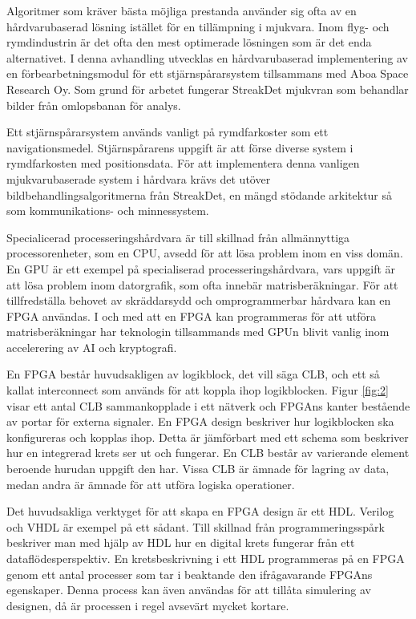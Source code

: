 \documentclass[12pt]{report}
\begin{document}
Algoritmer som kräver bästa möjliga prestanda använder sig ofta av en hårdvarubaserad lösning istället för en tillämpning i mjukvara. Inom flyg- och rymdindustrin är det ofta den mest optimerade lösningen som är det enda alternativet. I denna avhandling utvecklas en hårdvarubaserad implementering av en förbearbetningsmodul för ett stjärnspårarsystem tillsammans med Aboa Space Research Oy. Som grund för arbetet fungerar StreakDet mjukvran som behandlar bilder från omlopsbanan för analys. 
\par
Ett stjärnspårarsystem används vanligt på rymdfarkoster som ett navigationsmedel. Stjärnspårarens uppgift är att förse diverse system i rymdfarkosten med positionsdata. För att implementera denna vanligen mjukvarubaserade system i hårdvara krävs det utöver bildbehandlingsalgoritmerna från StreakDet, en mängd stödande arkitektur så som kommunikations- och minnessystem.
\par
Specialicerad processeringshårdvara är till skillnad från allmännyttiga processorenheter, som en CPU, avsedd för att lösa problem inom en viss domän. En GPU är ett exempel på specialiserad processeringshårdvara, vars uppgift är att lösa problem inom datorgrafik, som ofta innebär matrisberäkningar. För att tillfredställa behovet av skräddarsydd och omprogrammerbar hårdvara kan en FPGA användas. I och med att en FPGA kan programmeras för att utföra matrisberäkningar har teknologin tillsammands med GPUn blivit vanlig inom accelerering av AI och kryptografi.
\par
En FPGA består huvudsakligen av logikblock, det vill säga CLB, och ett så kallat interconnect som används för att koppla ihop logikblocken. Figur \ref{fig:2} visar ett antal CLB sammankopplade i ett nätverk och FPGAns kanter bestående av portar för externa signaler. En FPGA design beskriver hur logikblocken ska konfigureras och kopplas ihop. Detta är jämförbart med ett schema som beskriver hur en integrerad krets ser ut och fungerar. En CLB består av varierande element beroende hurudan uppgift den har. Vissa CLB är ämnade för lagring av data, medan andra är ämnade för att utföra logiska operationer. \citep{XilVivado}
\par
Det huvudsakliga verktyget för att skapa en FPGA design är ett HDL. Verilog och VHDL är exempel på ett sådant. Till skillnad från programmeringsspårk beskriver man med hjälp av HDL hur en digital krets fungerar från ett dataflödesperspektiv. En kretsbeskrivning i ett HDL programmeras på en FPGA genom ett antal processer som tar i beaktande den ifrågavarande FPGAns egenskaper. Denna process kan även användas för att tillåta simulering av designen, då är processen i regel avsevärt mycket kortare.
\end{document}
